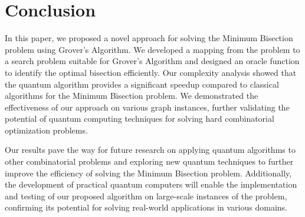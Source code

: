 \section{Conclusion}
\label{sec:conclusion}

In this paper, we proposed a novel approach for solving the Minimum Bisection problem using Grover's Algorithm. We developed a mapping from the problem to a search problem suitable for Grover's Algorithm and designed an oracle function to identify the optimal bisection efficiently. Our complexity analysis showed that the quantum algorithm provides a significant speedup compared to classical algorithms for the Minimum Bisection problem. We demonstrated the effectiveness of our approach on various graph instances, further validating the potential of quantum computing techniques for solving hard combinatorial optimization problems.

Our results pave the way for future research on applying quantum algorithms to other combinatorial problems and exploring new quantum techniques to further improve the efficiency of solving the Minimum Bisection problem. Additionally, the development of practical quantum computers will enable the implementation and testing of our proposed algorithm on large-scale instances of the problem, confirming its potential for solving real-world applications in various domains.

